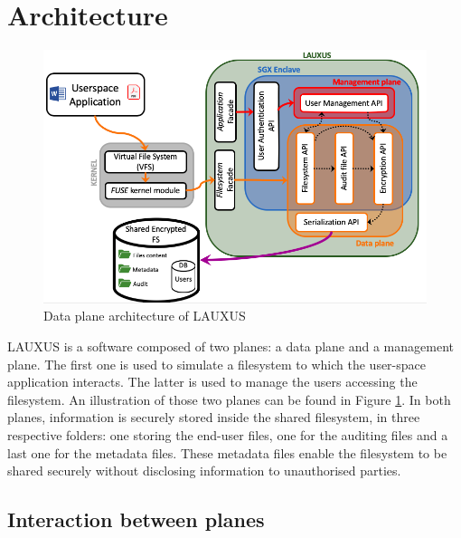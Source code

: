 \documentclass[../main.tex]{subfiles}
\begin{document}
\section{Architecture}
\label{section:lauxus:architecture}

\begin{figure}[h]
    \centering
    \includegraphics[width=\textwidth]{images/lauxus/architecture}
    
    \caption{Data plane architecture of LAUXUS}
    \label{figure:approach:architecture}
\end{figure}
\par LAUXUS is a software composed of two planes: a data plane and a management plane. The first one is used to simulate a filesystem to which the user-space application interacts. The latter is used to manage the users accessing the filesystem. An illustration of those two planes can be found in Figure \ref{figure:approach:architecture}. In both planes, information is securely stored inside the shared filesystem, in three respective folders: one storing the end-user files, one for the auditing files and a last one for the metadata files. These metadata files enable the filesystem to be shared securely without disclosing information to unauthorised parties.


\subsection{Interaction between planes}
\label{section:lauxus:architecture_process}
\end{document}

